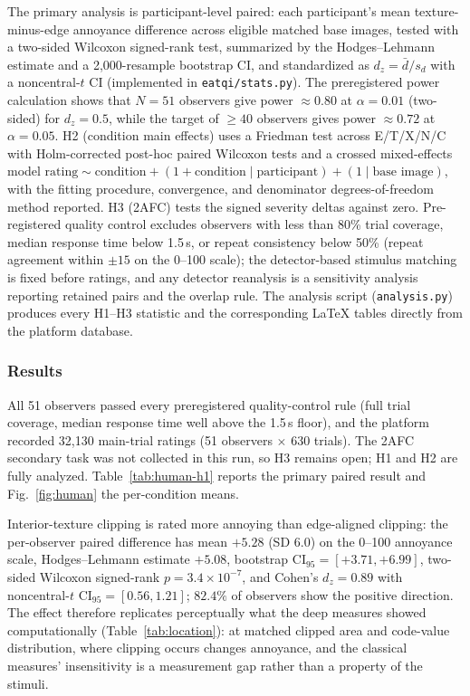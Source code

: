 \documentclass[5p,times,twocolumn]{elsarticle}
\begin{document}
The primary analysis is participant-level paired: each participant's mean
texture-minus-edge annoyance difference across eligible matched base images,
tested with a two-sided Wilcoxon signed-rank test, summarized by the
Hodges--Lehmann estimate and a 2{,}000-resample bootstrap CI, and standardized
as $d_z = \bar{d}/s_d$ with a noncentral-$t$ CI (implemented in
\texttt{eatqi/stats.py}). The preregistered power calculation shows that
$N = 51$ observers give power $\approx 0.80$ at $\alpha = 0.01$ (two-sided)
for $d_z = 0.5$, while the target of $\ge 40$ observers gives power
$\approx 0.72$ at $\alpha = 0.05$. H2 (condition main effects) uses a
Friedman test across E/T/X/N/C with Holm-corrected post-hoc paired Wilcoxon
tests and a crossed mixed-effects model
$\text{rating} \sim \text{condition} + (1 + \text{condition} \mid
\text{participant}) + (1 \mid \text{base image})$, with the fitting
procedure, convergence, and denominator degrees-of-freedom method reported.
H3 (2AFC) tests the signed severity deltas against zero. Pre-registered
quality control excludes observers with less than 80\% trial coverage,
median response time below 1.5\,s, or repeat consistency below 50\% (repeat
agreement within $\pm 15$ on the 0--100 scale); the detector-based stimulus
matching is fixed before ratings, and any detector reanalysis is a
sensitivity analysis reporting retained pairs and the overlap rule. The
analysis script (\texttt{analysis.py}) produces every H1--H3 statistic and
the corresponding \LaTeX{} tables directly from the platform database.

\subsubsection{Results}
\label{sec:human-results}

All 51 observers passed every preregistered quality-control rule (full trial
coverage, median response time well above the 1.5\,s floor), and the platform
recorded 32{,}130 main-trial ratings (51 observers $\times$ 630 trials). The
2AFC secondary task was not collected in this run, so H3 remains open; H1 and
H2 are fully analyzed. Table~\ref{tab:human-h1} reports the primary paired
result and Fig.~\ref{fig:human} the per-condition means.

Interior-texture clipping is rated more annoying than edge-aligned clipping:
the per-observer paired difference has mean $+5.28$ (SD $6.0$) on the 0--100
annoyance scale, Hodges--Lehmann estimate $+5.08$, bootstrap
$\mathrm{CI}_{95} = [+3.71, +6.99]$, two-sided Wilcoxon signed-rank
$p = 3.4 \times 10^{-7}$, and Cohen's $d_z = 0.89$ with noncentral-$t$
$\mathrm{CI}_{95} = [0.56, 1.21]$; $82.4\%$ of observers show the positive
direction. The effect therefore replicates perceptually what the deep
measures showed computationally (Table~\ref{tab:location}): at matched
clipped area and code-value distribution, where clipping occurs changes
annoyance, and the classical measures' insensitivity is a measurement gap
rather than a property of the stimuli.
\end{document}
